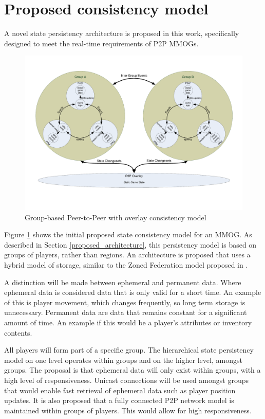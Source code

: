 \documentclass[journal,oneside,a4paper,onecolumn]{IEEEtran}
\begin{document}
\section{Proposed consistency model}
\label{proposed_consistency}

A novel state persistency architecture is proposed in this work, specifically designed to meet the real-time requirements of P2P MMOGs.

\begin{figure}[htbp]
 \centering
 \includegraphics[clip=true, viewport= 1cm 3cm 28.5cm 19cm, width=\columnwidth]{group_based_P2P_P2PO}
 \caption{Group-based Peer-to-Peer with overlay consistency model}
 \label{fig_p2p_group_o_cm}
\end{figure}
%
Figure \ref{fig_p2p_group_o_cm} shows the initial proposed state consistency model for an MMOG. As described in Section \ref{proposed_architecture}, this persistency model is based on groups of players, rather than regions. An architecture is proposed that uses a hybrid model of storage, similar to the Zoned Federation model proposed in \cite{zoned_federation}.

A distinction will be made between ephemeral and permanent data. Where ephemeral data is considered data that is only valid for a short time. An example of this is player movement, which changes frequently, so long term storage is unnecessary. Permanent data are data that remains constant for a significant amount of time. An example if this would be a player's attributes or inventory contents.

All players will form part of a specific group. The hierarchical state persistency model on one level operates within groups and on the higher level, amongst groups. The proposal is that ephemeral data will only exist within groups, with a high level of responsiveness. Unicast connections will be used amongst groups that would enable fast retrieval of ephemeral data such as player position updates. It is also proposed that a fully connected P2P network model is maintained within groups of players. This would allow for high responsiveness.
\end{document}
